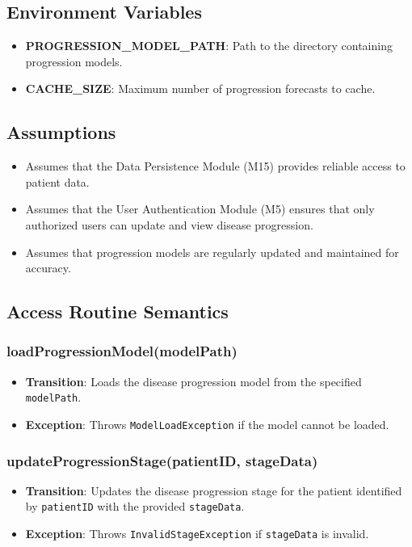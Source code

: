 \documentclass[12pt, titlepage]{article}
\begin{document}
\subsection{Environment Variables}
\begin{itemize}
    \item \textbf{PROGRESSION\_MODEL\_PATH}: Path to the directory containing progression models.
    \item \textbf{CACHE\_SIZE}: Maximum number of progression forecasts to cache.
\end{itemize}

\subsection{Assumptions}
\begin{itemize}
    \item Assumes that the Data Persistence Module (M15) provides reliable access to patient data.
    \item Assumes that the User Authentication Module (M5) ensures that only authorized users can update and view disease progression.
    \item Assumes that progression models are regularly updated and maintained for accuracy.
\end{itemize}

\subsection{Access Routine Semantics}

\subsubsection{loadProgressionModel(modelPath)}
\begin{itemize}
    \item \textbf{Transition}: Loads the disease progression model from the specified \texttt{modelPath}.
    \item \textbf{Exception}: Throws \texttt{ModelLoadException} if the model cannot be loaded.
\end{itemize}

\subsubsection{updateProgressionStage(patientID, stageData)}
\begin{itemize}
    \item \textbf{Transition}: Updates the disease progression stage for the patient identified by \texttt{patientID} with the provided \texttt{stageData}.
    \item \textbf{Exception}: Throws \texttt{InvalidStageException} if \texttt{stageData} is invalid.
\end{itemize}
\end{document}
